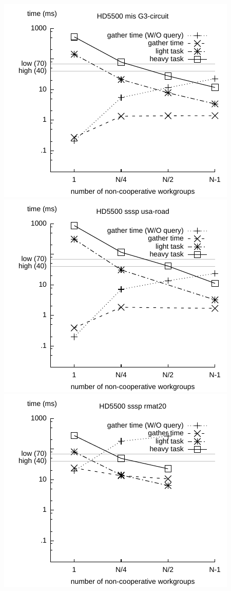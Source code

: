 \documentclass[parskip=half,sigconf,review, anonymous=true, acmcopyrightmode=none]{acmart}
\begin{document}
\includegraphics[width=.7\columnwidth]{images/barrier/hd5500_mis_G3_circuit.pdf} \\
\includegraphics[width=.7\columnwidth]{images/barrier/hd5500_sssp_usa_road.pdf} \\
\includegraphics[width=.7\columnwidth]{images/barrier/hd5500_sssp_rmat20.pdf} \\
\end{document}
